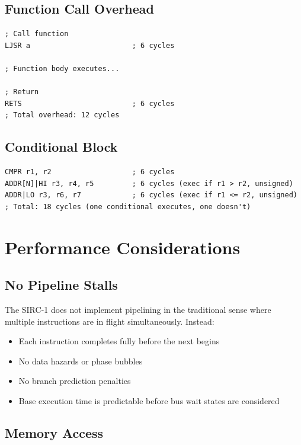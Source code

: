 \subsection{Function Call Overhead}
\begin{lstlisting}
; Call function
LJSR a                        ; 6 cycles

; Function body executes...

; Return
RETS                          ; 6 cycles
; Total overhead: 12 cycles
\end{lstlisting}

\subsection{Conditional Block}
\begin{lstlisting}
CMPR r1, r2                   ; 6 cycles
ADDR[N]|HI r3, r4, r5         ; 6 cycles (exec if r1 > r2, unsigned)
ADDR|LO r3, r6, r7            ; 6 cycles (exec if r1 <= r2, unsigned)
; Total: 18 cycles (one conditional executes, one doesn't)
\end{lstlisting}

\section{Performance Considerations}

\subsection{No Pipeline Stalls}

The SIRC-1 does not implement pipelining in the traditional sense where multiple instructions are in flight
simultaneously. Instead:

\begin{itemize}
	\item Each instruction completes fully before the next begins
	\item No data hazards or phase bubbles
	\item No branch prediction penalties
	\item Base execution time is predictable before bus wait states are considered
\end{itemize}

\subsection{Memory Access}

